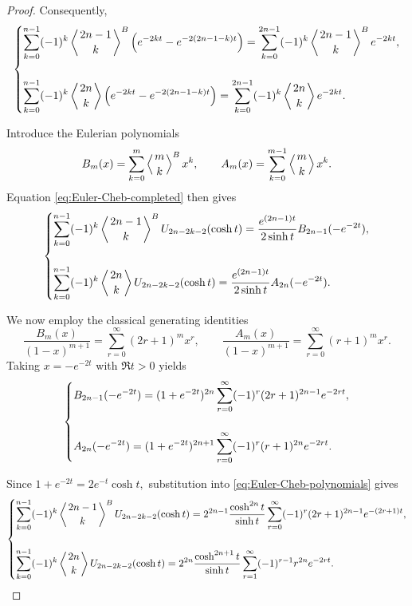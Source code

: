 \documentclass[11pt,twoside]{article}
\numberwithin{equation}{section}
\begin{document}
\begin{proof}
Consequently,
\begin{equation}\label{eq:Euler-Cheb-completed}
\begin{dcases}
\displaystyle
\sum_{k=0}^{n-1}
(-1)^k
\left\langle {2n-1\atop k}\right\rangle^{B}
\left(
e^{-2kt}
-
e^{-2(2n-1-k)t}
\right)
=
\sum_{k=0}^{2n-1}
(-1)^k
\left\langle {2n-1\atop k}\right\rangle^{B}
e^{-2kt},
\\[3ex]
\displaystyle
\sum_{k=0}^{n-1}
(-1)^k
\left\langle {2n\atop k}\right\rangle
\left(
e^{-2kt}
-
e^{-2(2n-1-k)t}
\right)
=
\sum_{k=0}^{2n-1}
(-1)^k
\left\langle {2n\atop k}\right\rangle
e^{-2kt}.
\end{dcases}
\end{equation}

Introduce the Eulerian polynomials
\[
B_m(x)
=
\sum_{k=0}^{m}
\left\langle {m\atop k}\right\rangle^{B}x^k,
\qquad
A_m(x)
=
\sum_{k=0}^{m-1}
\left\langle {m\atop k}\right\rangle x^k.
\]
Equation \eqref{eq:Euler-Cheb-completed} then gives
\begin{equation}\label{eq:Euler-Cheb-polynomials}
\begin{dcases}
\displaystyle
\sum_{k=0}^{n-1}
(-1)^k
\left\langle {2n-1\atop k}\right\rangle^{B}
U_{2n-2k-2}(\cosh t)
=
\frac{e^{(2n-1)t}}{2\sinh t}
B_{2n-1}(-e^{-2t}),
\\[3ex]
\displaystyle
\sum_{k=0}^{n-1}
(-1)^k
\left\langle {2n\atop k}\right\rangle
U_{2n-2k-2}(\cosh t)
=
\frac{e^{(2n-1)t}}{2\sinh t}
A_{2n}(-e^{-2t}).
\end{dcases}
\end{equation}

We now employ the classical generating identities
\[
\frac{B_m(x)}{(1-x)^{m+1}}
=
\sum_{r=0}^{\infty}(2r+1)^m x^r,
\qquad
\frac{A_m(x)}{(1-x)^{m+1}}
=
\sum_{r=0}^{\infty}(r+1)^m x^r.
\]
Taking $x=-e^{-2t}$ with $\Re t > 0$ yields
\begin{equation}\label{eq:Euler-Cheb-generating}
\begin{dcases}
\displaystyle
B_{2n-1}(-e^{-2t})
=
(1+e^{-2t})^{2n}
\sum_{r=0}^{\infty}
(-1)^r(2r+1)^{2n-1}e^{-2rt},
\\[3ex]
\displaystyle
A_{2n}(-e^{-2t})
=
(1+e^{-2t})^{2n+1}
\sum_{r=0}^{\infty}
(-1)^r(r+1)^{2n}e^{-2rt}.
\end{dcases}
\end{equation}

Since \(\displaystyle1+e^{-2t}=2e^{-t}\cosh t,\) substitution into \eqref{eq:Euler-Cheb-polynomials} gives
\begin{equation}\label{eq:Euler-Cheb-series}
\begin{dcases}
\displaystyle
\sum_{k=0}^{n-1}
(-1)^k
\left\langle {2n-1\atop k}\right\rangle^{B}
U_{2n-2k-2}(\cosh t)
=
2^{2n-1}
\frac{\cosh^{2n}t}{\sinh t}
\sum_{r=0}^{\infty}
(-1)^r(2r+1)^{2n-1}e^{-(2r+1)t},
\\[3ex]
\displaystyle
\sum_{k=0}^{n-1}
(-1)^k
\left\langle {2n\atop k}\right\rangle
U_{2n-2k-2}(\cosh t)
=
2^{2n}
\frac{\cosh^{2n+1}t}{\sinh t}
\sum_{r=1}^{\infty}
(-1)^{r-1}r^{2n}e^{-2rt}.
\end{dcases}
\end{equation}


\end{proof}
\end{document}
